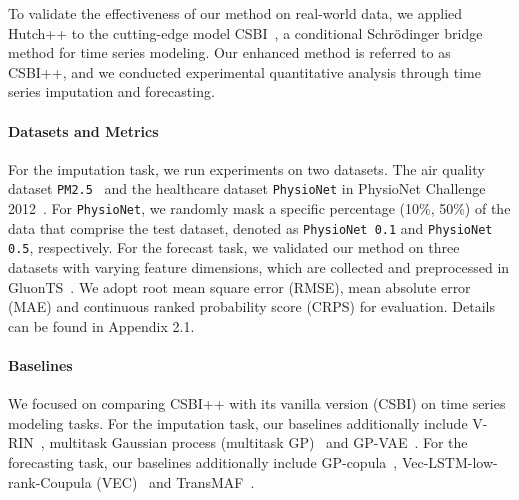 To validate the effectiveness of our method on real-world data, we applied Hutch++ to the cutting-edge model CSBI~\citep{provably_schrodinger_bridge}, 
a conditional Schrödinger bridge method for time series modeling.
Our enhanced method is referred to as CSBI++, and we conducted experimental quantitative analysis through time series imputation and forecasting.

\paragraph{Datasets and Metrics}\label{sec: exp_time_data}
For the imputation task, we run experiments on two datasets. 
The air quality dataset \texttt{PM2.5}~\citep{yi2016pm25} and the healthcare dataset \texttt{PhysioNet} in PhysioNet Challenge 2012~\citep{silva2012physio}.
For \texttt{PhysioNet}, we randomly mask a specific percentage (10\%, 50\%) of the data that comprise the test dataset, denoted as \texttt{PhysioNet 0.1} and \texttt{PhysioNet 0.5}, respectively.
For the forecast task, we validated our method on three datasets with varying feature dimensions, which are collected and preprocessed in GluonTS~\citet{alexandrov2020gluonts}. We adopt root mean square error (RMSE), mean absolute error (MAE) and continuous ranked probability score (CRPS) for evaluation.
Details can be found in Appendix 2.1.

\paragraph{Baselines}
We focused on comparing CSBI++ with its vanilla version (CSBI) on time series modeling tasks.
For the imputation task, our baselines additionally include V-RIN~\citep{mulyadi2021vrin}, multitask Gaussian process (multitask GP)~\citep{durichen2014multitaskgp} and GP-VAE~\citep{fortuin2020gpvae}.
For the forecasting task, our baselines additionally include GP-copula~\citep{salinas2019gpcopula}, Vec-LSTM-low-rank-Coupula (VEC)~\citep{salinas2019gpcopula} and TransMAF~\citep{rasul2021transmaf}.

